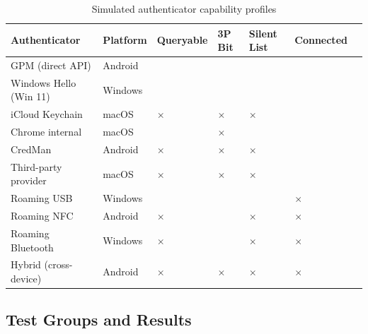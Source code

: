 \documentclass[12pt,a4paper]{article}
\newcommand{\yes}{\textcolor{green!70!black}{\checkmark}}
\newcommand{\no}{\textcolor{red!70!black}{$\times$}}
\begin{document}
\begin{table}[h]
\centering
\caption{Simulated authenticator capability profiles}
\label{tab:authenticators}
\small
\begin{tabularx}{\textwidth}{llXXXXX}
\toprule
\textbf{Authenticator} & \textbf{Platform} & \textbf{Queryable} & \textbf{3P Bit} & \textbf{Silent List} & \textbf{Connected} \\
\midrule
GPM (direct API) & Android & \yes & \yes & \yes & \yes \\
Windows Hello (Win 11) & Windows & \yes & \yes & \yes & \yes \\
iCloud Keychain & macOS & \no & \no & \no & \yes \\
Chrome internal & macOS & \yes & \no & \yes & \yes \\
CredMan & Android & \no & \no & \no & \yes \\
Third-party provider & macOS & \no & \no & \no & \yes \\
Roaming USB & Windows & \yes & \yes & \yes & \no \\
Roaming NFC & Android & \no & \yes & \no & \no \\
Roaming Bluetooth & Windows & \no & \yes & \no & \no \\
Hybrid (cross-device) & Android & \no & \no & \no & \no \\
\bottomrule
\end{tabularx}
\end{table}

\subsection{Test Groups and Results}
\end{document}
